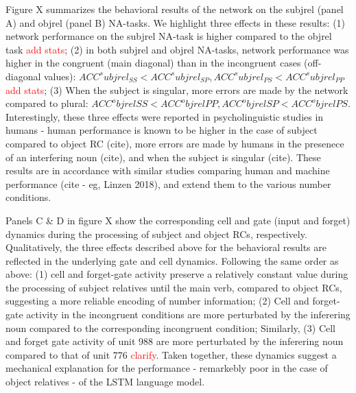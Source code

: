Figure X summarizes the behavioral results of the network on the subjrel (panel A) and objrel (panel B) NA-tasks. We highlight three effects in these results: (1) network performance on the subjrel NA-task is higher compared to the objrel task \textcolor{red}{add stats}; (2) in both subjrel and objrel NA-tasks, network performance was higher in the congruent (main diagonal) than in the incongruent cases (off-diagonal values): $ACC^subjrel_{SS}<ACC^subjrel_{SP}, ACC^subjrel_{PS}<ACC^subjrel_{PP}$ \textcolor{red}{add stats}; (3) When the subject is singular, more errors are made by the network compared to plural: $ACC^objrel{SS}<ACC^objrel{PP}, ACC^objrel{SP}<ACC^objrel{PS}$. Interestingly, these three effects were reported in psycholinguistic studies in humans - human performance is known to be higher in the case of subject compared to object RC (cite), more errors are made by humans in the presenece of an interfering noun (cite), and when the subject is singular (cite). These results are in accordance with similar studies comparing human and machine performance (cite - eg, Linzen 2018), and extend them to the various number conditions.

Panels C \& D in figure X show the corresponding cell and gate (input and forget) dynamics during the processing of subject and object RCs, respectively. Qualitatively, the three effects described above for the behavioral results are reflected in the underlying gate and cell dynamics. Following the same order as above: (1) cell and forget-gate activity preserve a relatively constant value during the processing of subject relatives until the main verb, compared to object RCs, suggesting a more reliable encoding of number information; (2) Cell and forget-gate activity in the incongruent conditions are more perturbated by the inferering noun compared to the corresponding incongruent condition; Similarly, (3) Cell and forget gate activity of unit 988 are more perturbated by the inferering noun compared to that of unit 776 \textcolor{red}{clarify}. Taken together, these dynamics suggest a mechanical explanation for the performance - remarkebly poor in the case of object relatives - of the LSTM language model.

